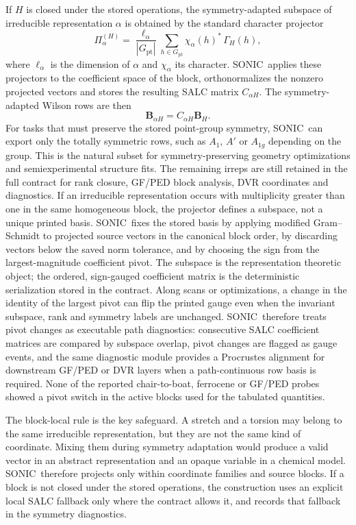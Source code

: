 \documentclass[journal=jctcce,manuscript=article,layout=traditional]{achemso}
\newcommand{\SONIC}{SONIC}
\newcommand{\Bmat}{\mathbf{B}}
\theoremstyle{definition}
\begin{document}
If \(H\) is closed under the stored operations, the symmetry-adapted subspace of
irreducible representation \(\alpha\) is obtained by the standard character
projector
\begin{equation}
  \Pi_{\alpha}^{(H)}
  =
  \frac{\ell_\alpha}{|G_{\mathrm{pt}}|}
  \sum_{h\in G_{\mathrm{pt}}}
  \chi_\alpha(h)^*\,\Gamma_H(h),
\end{equation}
where \(\ell_\alpha\) is the dimension of \(\alpha\) and
\(\chi_\alpha\) its character.  \SONIC\ applies these projectors to the coefficient
space of the block, orthonormalizes the nonzero projected vectors and stores the
resulting SALC matrix \(C_{\alpha H}\).  The symmetry-adapted Wilson rows are
then
\[
  \Bmat_{\alpha H}=C_{\alpha H}\Bmat_H .
\]
For tasks that must preserve the stored point-group symmetry, \SONIC\ can export
only the totally symmetric rows, such as \(A_1\), \(A'\) or \(A_{1g}\)
depending on the group.  This is the natural subset for symmetry-preserving
geometry optimizations and semiexperimental structure fits.  The remaining
irreps are still retained in the full contract for rank closure, GF/PED block
analysis, DVR coordinates and diagnostics.
If an irreducible representation occurs with multiplicity greater than one in
the same homogeneous block, the projector defines a subspace, not a unique
printed basis.  \SONIC\ fixes the stored basis by applying modified
Gram--Schmidt to projected source vectors in the canonical block order, by
discarding vectors below the saved norm tolerance, and by choosing the sign from
the largest-magnitude coefficient pivot.  The subspace is the representation
theoretic object; the ordered, sign-gauged coefficient matrix is the
deterministic serialization stored in the contract.
Along scans or optimizations, a change in the identity of the largest pivot can
flip the printed gauge even when the invariant subspace, rank and symmetry
labels are unchanged.  \SONIC\ therefore treats pivot changes as executable path
diagnostics: consecutive SALC coefficient matrices are compared by subspace
overlap, pivot changes are flagged as gauge events, and the same diagnostic
module provides a Procrustes alignment for downstream GF/PED or DVR layers
when a path-continuous row basis is required.  None of the reported
chair-to-boat, ferrocene or GF/PED probes showed a pivot switch in the active
blocks used for the tabulated quantities.

The block-local rule is the key safeguard.  A stretch and a torsion may
belong to the same irreducible representation, but they are not the same kind
of coordinate.  Mixing them during symmetry adaptation would produce a valid
vector in an abstract representation and an opaque variable in a chemical
model.  \SONIC\ therefore projects only within coordinate families and source
blocks.  If a block is not closed under the stored operations, the construction uses
an explicit local SALC fallback only where the contract allows it, and records
that fallback in the symmetry diagnostics.
\end{document}
